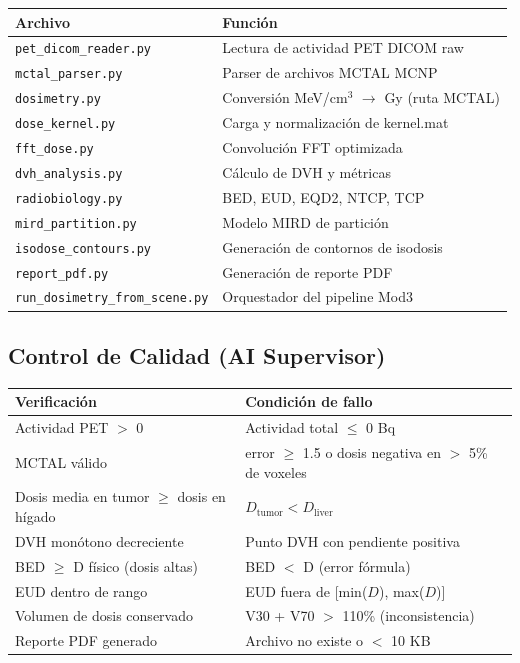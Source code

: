\documentclass[12pt,a4paper]{article}
\begin{document}
\begin{tabular}{p{5cm} p{10cm}}
\toprule
\textbf{Archivo} & \textbf{Función} \\
\midrule
\texttt{pet\_dicom\_reader.py} & Lectura de actividad PET DICOM raw \\
\texttt{mctal\_parser.py} & Parser de archivos MCTAL MCNP \\
\texttt{dosimetry.py} & Conversión MeV/cm$^3$ $\to$ Gy (ruta MCTAL) \\
\texttt{dose\_kernel.py} & Carga y normalización de kernel.mat \\
\texttt{fft\_dose.py} & Convolución FFT optimizada \\
\texttt{dvh\_analysis.py} & Cálculo de DVH y métricas \\
\texttt{radiobiology.py} & BED, EUD, EQD2, NTCP, TCP \\
\texttt{mird\_partition.py} & Modelo MIRD de partición \\
\texttt{isodose\_contours.py} & Generación de contornos de isodosis \\
\texttt{report\_pdf.py} & Generación de reporte PDF \\
\texttt{run\_dosimetry\_from\_scene.py} & Orquestador del pipeline Mod3 \\
\bottomrule
\end{tabular}

\subsection*{Control de Calidad (AI Supervisor)}

\begin{tabular}{p{5cm} p{10cm}}
\toprule
\textbf{Verificación} & \textbf{Condición de fallo} \\
\midrule
Actividad PET $>$ 0 & Actividad total $\leq$ 0 Bq \\
MCTAL válido & error $\geq$ 1.5 o dosis negativa en $>$ 5\% de voxeles \\
Dosis media en tumor $\geq$ dosis en hígado & $D_{\text{tumor}} < D_{\text{liver}}$ \\
DVH monótono decreciente & Punto DVH con pendiente positiva \\
BED $\geq$ D físico (dosis altas) & BED $<$ D (error fórmula) \\
EUD dentro de rango & EUD fuera de [min($D$), max($D$)] \\
Volumen de dosis conservado & V30 + V70 $>$ 110\% (inconsistencia) \\
Reporte PDF generado & Archivo no existe o $<$ 10 KB \\
\bottomrule
\end{tabular}
\end{document}
